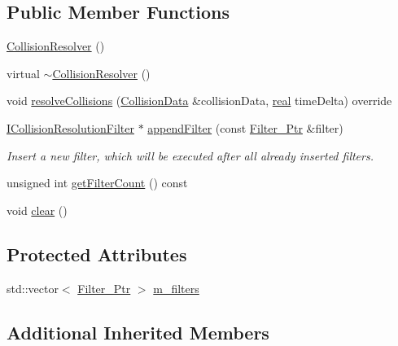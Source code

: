 \subsection*{Public Member Functions}
\begin{DoxyCompactItemize}
\item 
\mbox{\hyperlink{classr3_1_1_collision_resolver_a7b90e276403fa8422879228a189432fb}{Collision\+Resolver}} ()
\item 
virtual \mbox{\hyperlink{classr3_1_1_collision_resolver_ad172d58efecf5ef38f42020f21746f02}{$\sim$\+Collision\+Resolver}} ()
\item 
void \mbox{\hyperlink{classr3_1_1_collision_resolver_a134da5221d60b34c568f7de29c9d0a58}{resolve\+Collisions}} (\mbox{\hyperlink{classr3_1_1_collision_data}{Collision\+Data}} \&collision\+Data, \mbox{\hyperlink{namespacer3_ab2016b3e3f743fb735afce242f0dc1eb}{real}} time\+Delta) override
\item 
\mbox{\hyperlink{classr3_1_1_i_collision_resolution_filter}{I\+Collision\+Resolution\+Filter}} $\ast$ \mbox{\hyperlink{classr3_1_1_collision_resolver_adad2e36c48000a5af14b679fde5e7b3d}{append\+Filter}} (const \mbox{\hyperlink{classr3_1_1_collision_resolver_a5b3838b81de7909c3c78268801d61414}{Filter\+\_\+\+Ptr}} \&filter)
\begin{DoxyCompactList}\small\item\em Insert a new filter, which will be executed after all already inserted filters. \end{DoxyCompactList}\item 
unsigned int \mbox{\hyperlink{classr3_1_1_collision_resolver_ae56e2125e24982ad368f0d87e9c2a28f}{get\+Filter\+Count}} () const
\item 
void \mbox{\hyperlink{classr3_1_1_collision_resolver_a1f4e3d97afae66c03581807a529678cd}{clear}} ()
\end{DoxyCompactItemize}
\subsection*{Protected Attributes}
\begin{DoxyCompactItemize}
\item 
std\+::vector$<$ \mbox{\hyperlink{classr3_1_1_collision_resolver_a5b3838b81de7909c3c78268801d61414}{Filter\+\_\+\+Ptr}} $>$ \mbox{\hyperlink{classr3_1_1_collision_resolver_abf1234ad45ba7f114b31950c90ccaaff}{m\+\_\+filters}}
\end{DoxyCompactItemize}
\subsection*{Additional Inherited Members}



